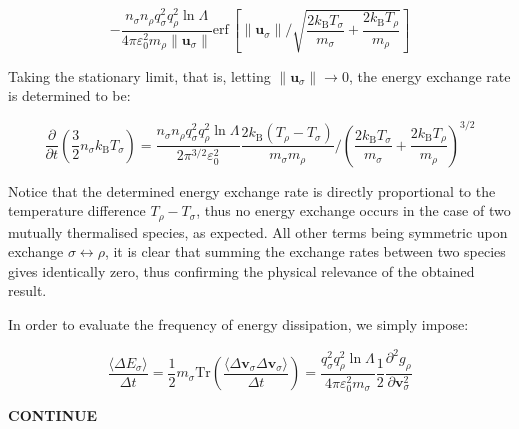 \begin{equation}
    \label{eq-fokker-138}
    -\frac{n_\sigma n_\rho q_\sigma^2q_\rho^2\ln{\Lambda}}{4\pi\varepsilon_0^2m_\rho\|\mathbf{u}_\sigma\|}\text{erf}\,\left[\|\mathbf{u}_\sigma\|\bigg/\sqrt{\frac{2k_\mathrm{B}T_\sigma}{m_\sigma}+\frac{2k_\mathrm{B}T_\rho}{m_\rho}}\right]
\end{equation}

Taking the stationary limit, that is, letting $\|\mathbf{u}_\sigma\|\to0$, the energy exchange rate is determined to be:

\begin{equation}
    \label{eq-fokker-139}
    \frac{\partial}{\partial t}\left(\frac{3}{2}n_\sigma k_\mathrm{B}T_\sigma\right)=\frac{n_\sigma n_\rho q_\sigma^2q_\rho^2\ln{\Lambda}}{2\pi^{3/2}\varepsilon_0^2}\frac{2k_\mathrm{B}(T_\rho-T_\sigma)}{m_\sigma m_\rho}\bigg/\left(\frac{2k_\mathrm{B}T_\sigma}{m_\sigma}+\frac{2k_\mathrm{B}T_\rho}{m_\rho}\right)^{3/2}
\end{equation}

Notice that the determined energy exchange rate is directly proportional to the temperature difference $T_\rho-T_\sigma$, thus no energy exchange occurs in the case of two mutually thermalised species, as expected. All other terms being symmetric upon exchange $\sigma\leftrightarrow\rho$, it is clear that summing the exchange rates between two species gives identically zero, thus confirming the physical relevance of the obtained result.

\quad In order to evaluate the frequency of energy dissipation, we simply impose:

\begin{equation}
    \frac{\langle\Delta E_\sigma\rangle}{\Delta t}=\frac{1}{2}m_\sigma\text{Tr}\left(\frac{\langle\Delta\mathbf{v}_\sigma\Delta\mathbf{v}_\sigma\rangle}{\Delta t}\right)=\frac{q_\sigma^2q_\rho^2\ln{\Lambda}}{4\pi\varepsilon_0^2m_\sigma}\frac{1}{2}\frac{\partial^2g_\rho}{\partial\mathbf{v}_\sigma^2}
\end{equation}

\begin{center}
    \textbf{CONTINUE}
\end{center}

